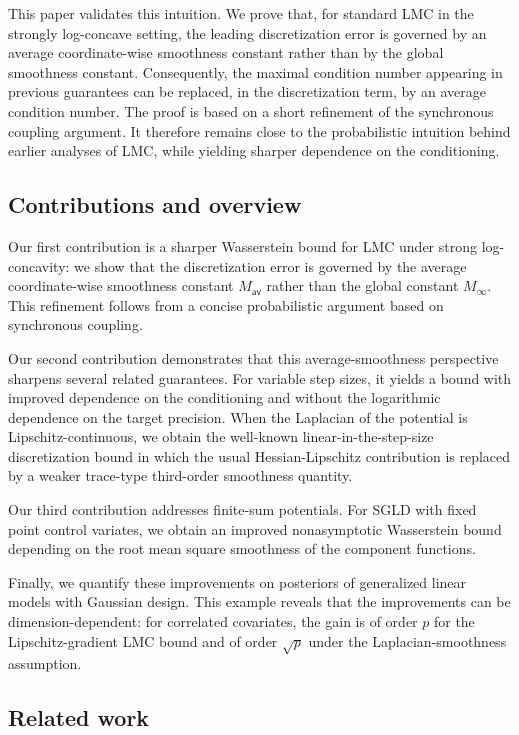 \documentclass[aos,reqno]{imsart}
\def\Mav{M_{\textsf{av}}}
\def\Mmax{M_{\infty}}
\theoremstyle{definition}
\begin{document}
This paper validates this intuition. We prove that, for 
standard LMC in the
strongly log-concave setting, the leading discretization
error is governed by an average coordinate-wise smoothness
constant rather than by the global smoothness constant.
Consequently, the maximal condition number appearing in
previous guarantees can be replaced, in the discretization
term, by an average condition number. The proof is based on
a short refinement of the synchronous coupling argument. It
therefore remains close to the probabilistic intuition
behind earlier analyses of LMC, while yielding sharper
dependence on the conditioning.

\subsection{Contributions and overview}

Our first contribution is a sharper Wasserstein bound 
for LMC under strong log-concavity: we show that the 
discretization error is governed by the average 
coordinate-wise smoothness constant $\Mav$ rather 
than the global constant $\Mmax$. This refinement 
follows from a concise probabilistic argument based 
on synchronous coupling.

Our second contribution demonstrates that this 
average-smoothness perspective sharpens several 
related guarantees. For variable step sizes, it yields a
bound with improved dependence on the conditioning and
without the logarithmic dependence on the target precision.
When the Laplacian of the potential is Lipschitz-continuous,
we obtain the well-known linear-in-the-step-size 
discretization bound in which the usual Hessian-Lipschitz contribution is replaced 
by a weaker trace-type third-order smoothness quantity.

Our third contribution addresses finite-sum potentials. 
For SGLD with fixed point control variates, we obtain an
improved nonasymptotic Wasserstein bound depending on the
root mean square smoothness of the component functions.

Finally, we quantify these improvements on posteriors 
of generalized linear models with
Gaussian design. This example reveals that the improvements
can be dimension-dependent: for correlated covariates, the
gain is of order $p$ for the Lipschitz-gradient LMC bound
and of order $\sqrt p$ under the Laplacian-smoothness
assumption.

\subsection{Related work}
\end{document}
